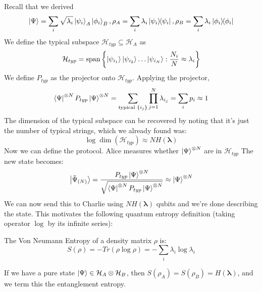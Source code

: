 Recall that we derived
\[ \ket{\Psi} = \sum_i \sqrt{\lambda_i} \ket{\psi_i}_A \ket{\phi_i}_B, \rho_A = \sum_i \lambda_i \ketbra{\psi_i}, \rho_B = \sum_i \lambda_i \ketbra{\phi_i} \]
We define the typical subspace $\mathcal{H}_{typ} \subseteq \mathcal{H}_A$ as
\[ \mathcal{H}_{typ} = \textrm{span}\left\{ \ket{\psi_{i_1}} \ket{\psi_{i_2}} \dots  \ket{\psi_{i_N}} : \frac{N_i}{N} \approx \lambda_i \right\} \]
We define $P_{typ}$ as the projector onto $\mathcal{H}_{typ}$. Applying the projector,
\[ \bra{\Psi}^{\otimes N} P_{typ} \ket{\Psi}^{\otimes N} = \sum_{\text{typical } \{i_j\} }  \prod_{j = 1}^N \lambda_{i_j} = \sum_{ i} p_i \approx 1 \]
The dimension of the typical subspace can be recovered by noting that it's just the number of typical strings, which we already found was:
\[ \log \dim(\mathcal{H}_{typ}) \approx N H(\mathbf{\lambda}) \]
Now we can define the protocol. Alice measures whether $\ket{\Psi}^{\otimes N}$ are in $\mathcal{H}_{typ}$ The new state becomes:
\[ \ket{\tilde{\Psi}_{(N)}} = \frac{P_{typ} \ket{\Psi}^{\otimes N}}{\sqrt{\bra{\Psi}^{\otimes N} P_{typ} \ket{\Psi}^{\otimes N} }} \approx \ket{\Psi}^{\otimes N}\]
We can now send this to Charlie using $N H(\mathbf{\lambda})$ qubits and we're done describing the state.
This motivates the following quantum entropy definition (taking operator $\log$ by its infinite series):
\begin{definition}
    The Von Neumann Entropy of a density matrix $\rho$ is:
    \[ S(\rho) = -Tr(\rho \log \rho) = - \sum_i \lambda_i \log \lambda_i\]
\end{definition}
If we have a pure state $\ket{\Psi} \in \mathcal{H}_A \otimes \mathcal{H}_B$, then $S(\rho_A) = S(\rho_B) = H(\mathbf{\lambda})$, and we term this
the entanglement entropy.


